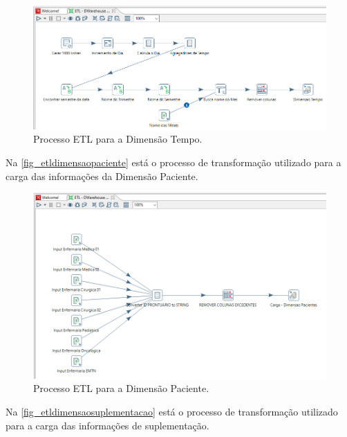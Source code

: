 \begin{figure}[htb]
	\caption{\label{fig_etldimensaotempo}Processo ETL para a Dimensão Tempo.}
	\begin{center}
	    \includegraphics[scale=0.6]{Imagens/figura - etl dw tempo.png}
	\end{center}
\end{figure}

Na \autoref{fig_etldimensaopaciente} está o processo de transformação utilizado para a carga das informações da Dimensão Paciente.

\begin{figure}[htb]
	\caption{\label{fig_etldimensaopaciente}Processo ETL para a Dimensão Paciente.}
	\begin{center}
	    \includegraphics[scale=0.6]{Imagens/figura - etl dw paciente.png}
	\end{center}
\end{figure}

\newpage
Na \autoref{fig_etldimensaosuplementacao} está o processo de transformação utilizado para a carga das informações de suplementação.

